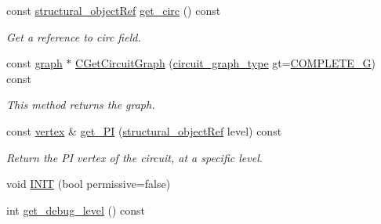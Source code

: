 \begin{DoxyCompactItemize}
const \hyperlink{structural__objects_8hpp_a8ea5f8cc50ab8f4c31e2751074ff60b2}{structural\+\_\+object\+Ref} \hyperlink{classstructural__manager_a56ff3164d2a57d12312fa3c7bfceb244}{get\+\_\+circ} () const
\begin{DoxyCompactList}\small\item\em Get a reference to circ field. \end{DoxyCompactList}\item 
const \hyperlink{structgraph}{graph} $\ast$ \hyperlink{classstructural__manager_a84ce3ac584d5d9d216e49ff09abdc9e5}{C\+Get\+Circuit\+Graph} (\hyperlink{classstructural__manager_a3ddbeaa6139edd572bbba57042d0a130}{circuit\+\_\+graph\+\_\+type} gt=\hyperlink{classstructural__manager_a3ddbeaa6139edd572bbba57042d0a130ae146a36ef45766fd339bb94010337a3a}{C\+O\+M\+P\+L\+E\+T\+E\+\_\+G}) const
\begin{DoxyCompactList}\small\item\em This method returns the graph. \end{DoxyCompactList}\item 
const \hyperlink{graph_8hpp_abefdcf0544e601805af44eca032cca14}{vertex} \& \hyperlink{classstructural__manager_adae0e39bd8724281a9560aafb17ef445}{get\+\_\+\+PI} (\hyperlink{structural__objects_8hpp_a8ea5f8cc50ab8f4c31e2751074ff60b2}{structural\+\_\+object\+Ref} level) const
\begin{DoxyCompactList}\small\item\em Return the PI vertex of the circuit, at a specific level. \end{DoxyCompactList}\item 
void \hyperlink{classstructural__manager_ae15c3bc3a4c48d8358799bd781de36eb}{I\+N\+IT} (bool permissive=false)
\item 
int \hyperlink{classstructural__manager_a062bf9fd8673b256c4bdd8469b5de2c1}{get\+\_\+debug\+\_\+level} () const
\end{DoxyCompactItemize}
